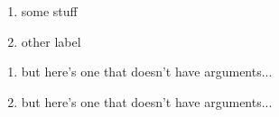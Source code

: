\documentclass{amsart}
\begin{document}
\begin{enumerate}[label=(\arabic*),topsep=3em, itemsep =3pt]
\item some stuff
\item other label
\end{enumerate}
\begin{enumerate}
\item but here's one that doesn't have arguments...
\item but here's one that doesn't have arguments...
\end{enumerate}
\end{document}
